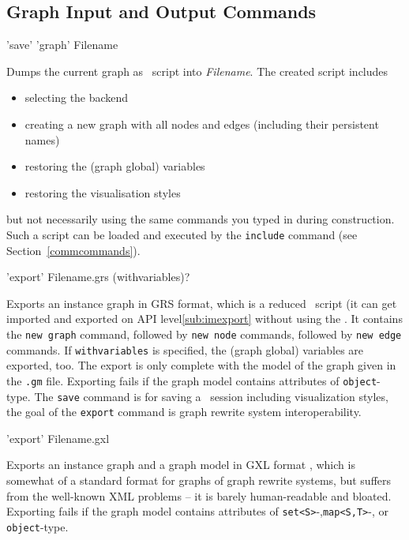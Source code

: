 \subsection{Graph Input and Output Commands}
\label{outputcmds}

\begin{rail}
  'save' 'graph' Filename
\end{rail}
Dumps the current graph as \GrShell\ script into \emph{Filename}.
The created script includes
\begin{itemize}
  \item selecting the backend
  \item creating a new graph with all nodes and edges (including their persistent names)
  \item restoring the (graph global) variables
  \item restoring the visualisation styles
\end{itemize}
but not necessarily using the same commands you typed in during construction. 
Such a script can be loaded and executed by the \texttt{include} command (see Section~\ref{commcommands}).

\begin{rail}
  'export' Filename.grs (withvariables)?
\end{rail}
Exports an instance graph in GRS format, which is a reduced \GrShell\ script (it can get imported and exported on API level\ref{sub:imexport} without using the \GrShell\).
It contains the \texttt{new graph} command, followed by \texttt{new node} commands, followed by \texttt{new edge} commands.
If \texttt{withvariables} is specified, the (graph global) variables are exported, too.
The export is only complete with the model of the graph given in the \texttt{.gm} file.
Exporting fails if the graph model contains attributes of \texttt{object}-type.
The \texttt{save} command is for saving a \GrShell\ session including visualization styles, the goal of the \texttt{export} command is graph rewrite system interoperability.

\begin{rail}
  'export' Filename.gxl
\end{rail}
Exports an instance graph and a graph model in GXL format \cite{GXL,GXL2}, which is somewhat of a standard format for graphs of graph rewrite systems, but suffers from the well-known XML problems -- it is barely human-readable and bloated.
Exporting fails if the graph model contains attributes of \texttt{set<S>}-,\texttt{map<S,T>}-, or \texttt{object}-type.

